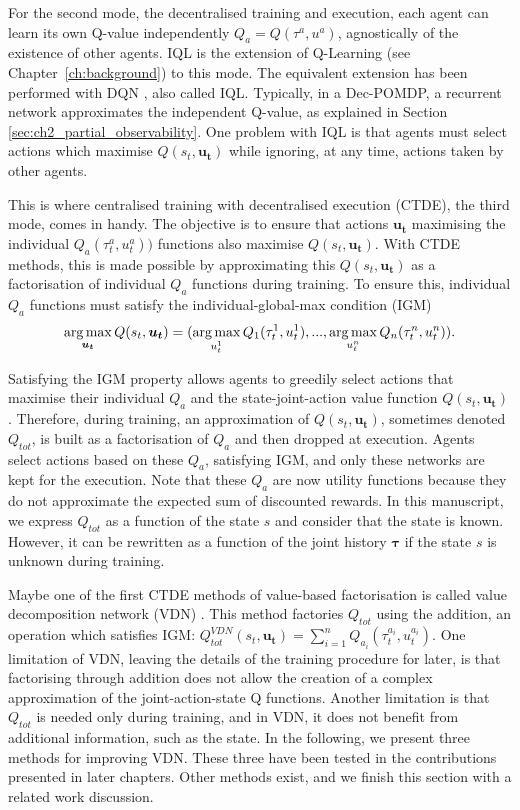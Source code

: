 For the second mode, the decentralised training and execution, each agent can learn its own Q-value independently $Q_a=Q(\tau^a, u^a)$, agnostically of the existence of other agents.
IQL \citep{Tan1993} is the extension of Q-Learning (see Chapter~\ref{ch:background}) to this mode. 
The equivalent extension has been performed with DQN \citep{TampuuDqnIQL}, also called IQL.
Typically, in a Dec-POMDP, a recurrent network approximates the independent Q-value, as explained in Section \ref{sec:ch2_partial_observability}.
One problem with IQL is that agents must select actions which maximise $Q(s_t, \mathbf{u_t})$ while ignoring, at any time, actions taken by other agents.

This is where centralised training with decentralised execution (CTDE), the third mode, comes in handy.
The objective is to ensure that actions $\mathbf{u_t}$ maximising the individual $Q_a(\tau_t^a, u_t^a))$ functions also maximise $Q(s_t, \mathbf{u_t})$.
With CTDE methods, this is made possible by approximating this $Q(s_t, \mathbf{u_t})$ as a factorisation of individual $Q_a$ functions during training.
To ensure this, individual $Q_a$ functions must satisfy the individual-global-max condition (IGM) \citep{Son2019QTRAN:Learning}
\begin{equation}
    \argmax_{\mathbf{u_t}} Q(s_t, \mathbf{u_t}) =(\argmax_{u_t^{1}} Q_{1}(\tau_t^{1}, u_t^{1}),...,\argmax_{u_t^{n}} Q_{n}(\tau_t^{n}, u_t^{n})).
    \label{eq:ch3_igm}
\end{equation}

Satisfying the IGM property allows agents to greedily select actions that maximise their individual $Q_a$ and the state-joint-action value function $Q(s_t, \mathbf{u_t})$.
Therefore, during training, an approximation of $Q(s_t, \mathbf{u_t})$, sometimes denoted $Q_{tot}$, is built as a factorisation of $Q_a$ and then dropped at execution.
Agents select actions based on these $Q_a$, satisfying IGM, and only these networks are kept for the execution.
Note that these $Q_a$ are now utility functions because they do not approximate the expected sum of discounted rewards.
In this manuscript, we express $Q_{tot}$ as a function of the state $s$ and consider that the state is known.
However, it can be rewritten as a function of the joint history $\mathbf{\tau}$ if the state $s$ is unknown during training.

Maybe one of the first CTDE methods of value-based factorisation is called value decomposition network (VDN) \citep{sunehag2018vdn}.
This method factories $Q_{tot}$ using the addition, an operation which satisfies IGM: $Q_{tot}^{VDN}(s_t, \mathbf{u_t}) = \sum_{i=1}^n Q_{a_i}(\tau^{a_i}_t, u^{a_i}_t)$.
One limitation of VDN, leaving the details of the training procedure for later, is that factorising through addition does not allow the creation of a complex approximation of the joint-action-state Q functions.
Another limitation is that $Q_{tot}$ is needed only during training, and in VDN, it does not benefit from additional information, such as the state.
In the following, we present three methods for improving VDN.
These three have been tested in the contributions presented in later chapters.
Other methods exist, and we finish this section with a related work discussion.

